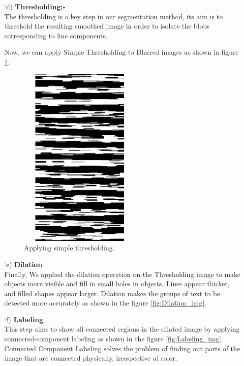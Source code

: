 \begin{itemize}
        \newpage
        
        \item[\char `d)] \textbf{Thresholding:-}\\
        The thresholding is a key step in our segmentation method, its aim is to threshold the resulting smoothed image in order to isolate the blobs corresponding to line components.
        
        Now, we can apply Simple Thresholding to Blurred images as shown in figure \ref{fig:treshold_img}.
        
        \begin{figure}[H]
            \centering
            \includegraphics[width=6cm, height=9cm]{images/threthold.png}
            \caption{Applying simple thresholding.}
            \label{fig:treshold_img}
        \end{figure}
        
        \newpage

        \item[\char `e)] \textbf{Dilation}\\
        Finally, We applied the dilation operation on the Thresholding image to make objects more visible and fill in small holes in objects. Lines appear thicker, and filled shapes appear larger. Dilation makes the groups of text to be detected more accurately as shown in the figure \ref{fig:Dilation_img}.%
        
        \item[\char `f)] \textbf{Labeling}\\
        This step aims to show all connected regions in the dilated image by applying connected-component labeling as shown in the figure \ref{fig:Labeling_img}.
        \\
        Connected Component Labeling solves the problem of finding out parts of the image that are connected physically, irrespective of color.
        

\end{itemize}
